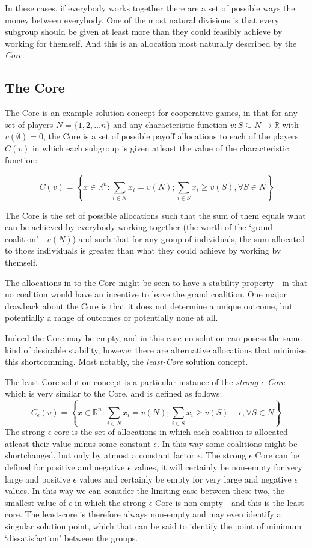 In these cases, if everybody works together there are a set of possible ways the money between everybody.
One of the most natural divisions is that every subgroup should be given at least more than they could feasibly achieve by working for themself.
And this is an allocation most naturally described by the \textit{Core}.

\subsection{The Core}

The Core is an example solution concept for cooperative games, in that for any set of players $N=\{1,2,\dots n\}$ and any characteristic function $v: S\subseteq N \rightarrow \mathbb{R}$ with $v(\emptyset)=0$, the Core is a set of possible payoff allocations to each of the players $C(v)$ in which each subgroup is given atleast the value of the characteristic function:

$$ C(v) = \left\{x\in\mathbb{R}^n : \sum_{i\in N}x_i=v(N); \sum_{i\in S}x_i \ge v(S), \forall S\in N \right\}$$

The Core is the set of possible allocations such that the sum of them equals what can be achieved by everybody working together (the worth of the `grand coalition' - $v(N)$) and such that for any group of individuals, the sum allocated to thoes individuals is greater than what they could achieve by working by themself.

The allocations in to the Core might be seen to have a stability property - in that no coalition would have an incentive to leave the grand coalition. One major drawback about the Core is that it does not determine a unique outcome, but potentially a range of outcomes or potentially none at all.

Indeed the Core may be empty, and in this case no solution can posess the same kind of desirable stability, however there are alternative allocations that minimise this shortcomming.
Most notably, the \textit{least-Core} solution concept.

The least-Core solution concept is a particular instance of the \textit{strong $\epsilon$ Core} which is very similar to the Core, and is defined as follows:
$$ C_\epsilon(v) = \left\{x\in\mathbb{R}^n : \sum_{i\in N}x_i=v(N); \sum_{i\in S}x_i \ge v(S)-\epsilon, \forall S\in N \right\}$$
The strong $\epsilon$ core is the set of allocations in which each coalition is allocated atleast their value minus some constant $\epsilon$.
In this way some coalitions might be shortchanged, but only by atmost a constant factor $\epsilon$.
The strong $\epsilon$ Core can be defined for positive and negative $\epsilon$ values, it will certainly be non-empty for very large and positive $\epsilon$ values and certainly be empty for very large and negative $\epsilon$ values.
In this way we can consider the limiting case between these two, the smallest value of $\epsilon$ in which the strong $\epsilon$ Core is non-empty - and this is the least-core.\cite{doi:10.1287/moor.4.4.303}
The least-core is therefore always non-empty and may even identify a singular solution point, which that can be said to identify the point of minimum `dissatisfaction' between the groups.

